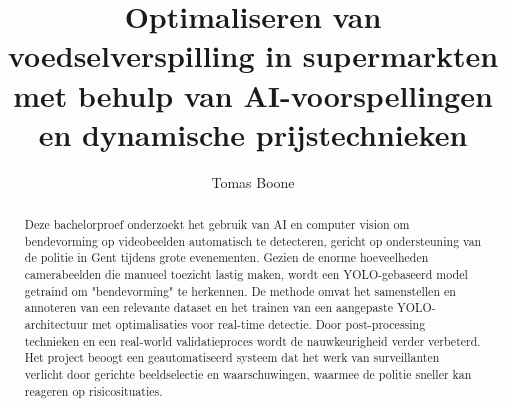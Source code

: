 \documentclass{hogent-article}
\title{Optimaliseren van voedselverspilling in supermarkten met behulp van AI-voorspellingen en dynamische prijstechnieken}
\author{Tomas Boone}
\begin{document}
    \begin{abstract}

Deze bachelorproef onderzoekt het gebruik van AI en computer vision om bendevorming op videobeelden automatisch te detecteren, gericht op ondersteuning van de politie in Gent tijdens grote evenementen. Gezien de enorme hoeveelheden camerabeelden die manueel toezicht lastig maken, wordt een YOLO-gebaseerd model getraind om "bendevorming" te herkennen. De methode omvat het samenstellen en annoteren van een relevante dataset en het trainen van een aangepaste YOLO-architectuur met optimalisaties voor real-time detectie. Door post-processing technieken en een real-world validatieproces wordt de nauwkeurigheid verder verbeterd. Het project beoogt een geautomatiseerd systeem dat het werk van surveillanten verlicht door gerichte beeldselectie en waarschuwingen, waarmee de politie sneller kan reageren op risicosituaties.
    \end{abstract}

    \tableofcontents

    

    \printbibliography[heading=bibintoc]
\end{document}
